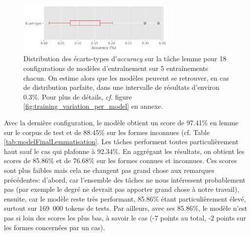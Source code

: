 \begin{figure}[ht]
    \centering
    \includegraphics[width=0.7\textwidth]{results/lemmatisation/entrainement/Variance.png}
    \caption{Distribution des écarts-types d'\textit{accuracy} sur la tâche lemme pour 18 configurations de modèles d'entraînement sur 5 entraînements chacun. On estime alors que les modèles peuvent se retrouver, en cas de distribution parfaite, dans une intervalle de résultats d'environ 0.3\%. Pour plus de détails, \textit{cf.} figure \ref{fig:training_variation_per_model} en annexe.}
    \label{fig:training_variation}
\end{figure}

Avec la dernière configuration, le modèle obtient un score de 97.41\% en lemme sur le corpus de test et de 88.45\% sur les formes inconnues (cf. Table \ref{tab:modelFinalLemmatisation}. Les tâches performent toutes particulièrement haut sauf le cas qui plafonne à 92.34\%. En aggrégant les résultats, on obtient les scores de 85.86\% et de 76.68\% sur les formes connues et inconnues. Ces scores sont plus faibles mais cela ne changent pas grand chose aux remarques précédentes: d'abord, car l'ensemble des tâches ne nous intéressent probablement pas (par exemple le degré ne devrait pas apporter grand chose à notre travail), ensuite, car le modèle reste très performant, 85.86\% étant particulièrement élevé, surtout sur 169~000 tokens de tests. Par ailleurs, avec ses 85.86\%, le modèle n'est pas si loin des scores les plus bas, à savoir le cas (-7 points au total, -2 points sur les formes concernées par un cas).

